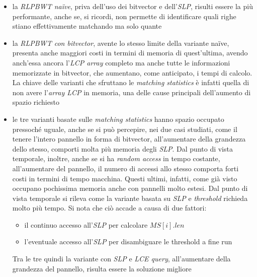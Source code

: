 \begin{itemize}
  \item la \textit{RLPBWT na\"{i}ve}, priva dell'uso dei bitvector e
  dell'\textit{SLP}, risulti essere la più performante, anche se, si ricordi,
  non permette di identificare quali righe stiano effettivamente matchando ma
  solo quante
  \item la \textit{RLPBWT con bitvector}, avente lo stesso limite della variante
  na\"{i}ve, presenta anche maggiori costi in termini di memoria di quest'ultima,
  avendo anch'essa ancora l'\textit{LCP array} completo ma anche tutte le
  informazioni memorizzate in bitvector, che aumentano, come anticipato, i tempi
  di calcolo. La chiave delle varianti che sfruttano
  le \textit{matching statistics} è infatti quella di non avere l'\textit{array
    LCP} in memoria, una delle cause principali dell'aumento di spazio richiesto
  \item le tre varianti basate sulle \textit{matching statistics} hanno spazio
  occupato pressoché uguale, anche se si può percepire, nei due casi studiati,
  come il tenere l'intero pannello in forma di bitvector, all'aumentare della
  grandezza dello stesso, comporti molta più memoria degli \textit{SLP}. Dal
  punto di vista temporale, inoltre, anche se si ha \textit{random access} in
  tempo costante, all'aumentare del pannello, il numero di accessi allo stesso
  comporta forti costi in termini di tempo macchina. Questi
  ultimi, infatti, come già visto occupano pochissima memoria anche con pannelli
  molto estesi. Dal punto di vista temporale si rileva come la variante basata
  su \textit{SLP} e \textit{threshold} richieda molto più tempo. Si nota che ciò
  accade a causa di due fattori:
  \begin{itemize}
    \item il continuo accesso all'\textit{SLP} per calcolare $MS[i].len$
    \item l'eventuale accesso all'\textit{SLP} per disambiguare le threshold a
    fine run
  \end{itemize}
  Tra le tre quindi la variante con \textit{SLP} e \textit{LCE query},
  all'aumentare della grandezza del pannello, risulta essere la soluzione
  migliore
\end{itemize}

